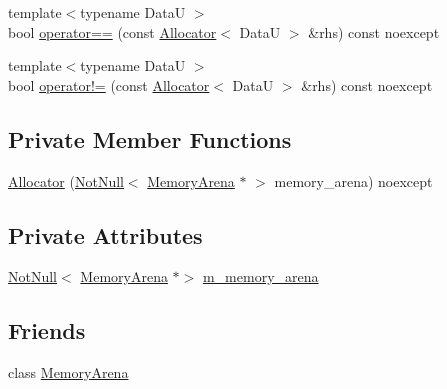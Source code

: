 \begin{DoxyCompactItemize}
\item 
{\footnotesize template$<$typename DataU $>$ }\\bool \mbox{\hyperlink{classmage_1_1_memory_arena_1_1_allocator_a7f7971d1bd4522ef847d30d1c5cf3666}{operator==}} (const \mbox{\hyperlink{classmage_1_1_memory_arena_1_1_allocator}{Allocator}}$<$ DataU $>$ \&rhs) const noexcept
\item 
{\footnotesize template$<$typename DataU $>$ }\\bool \mbox{\hyperlink{classmage_1_1_memory_arena_1_1_allocator_a3b20e43f85adbbd070f4dc6f3dca6eb1}{operator!=}} (const \mbox{\hyperlink{classmage_1_1_memory_arena_1_1_allocator}{Allocator}}$<$ DataU $>$ \&rhs) const noexcept
\end{DoxyCompactItemize}
\subsection*{Private Member Functions}
\begin{DoxyCompactItemize}
\item 
\mbox{\hyperlink{classmage_1_1_memory_arena_1_1_allocator_a0e4b65dba593a1fc8b77e7f2c4ad9659}{Allocator}} (\mbox{\hyperlink{namespacemage_a8769f9d670d6b585ea306cb1062af94b}{Not\+Null}}$<$ \mbox{\hyperlink{classmage_1_1_memory_arena}{Memory\+Arena}} $\ast$ $>$ memory\+\_\+arena) noexcept
\end{DoxyCompactItemize}
\subsection*{Private Attributes}
\begin{DoxyCompactItemize}
\item 
\mbox{\hyperlink{namespacemage_a8769f9d670d6b585ea306cb1062af94b}{Not\+Null}}$<$ \mbox{\hyperlink{classmage_1_1_memory_arena}{Memory\+Arena}} $\ast$$>$ \mbox{\hyperlink{classmage_1_1_memory_arena_1_1_allocator_af2f11f067fc3af6ebf94c24ce89e9258}{m\+\_\+memory\+\_\+arena}}
\end{DoxyCompactItemize}
\subsection*{Friends}
\begin{DoxyCompactItemize}
\item 
class \mbox{\hyperlink{classmage_1_1_memory_arena_1_1_allocator_a934e79307a45b6e72da26d1f10079550}{Memory\+Arena}}
\end{DoxyCompactItemize}


